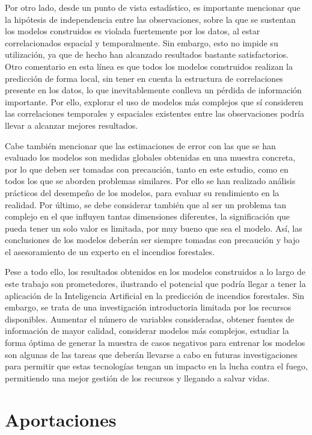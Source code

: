 \documentclass[12pt,a4paper,]{book}
\numberwithin{dummy}{section}
\theoremstyle{ocrenumbox}
\theoremstyle{blacknumex}
\theoremstyle{blacknumbox}
\theoremstyle{ocrenum}
\theoremstyle{ocrenum}
\begin{document}
Por otro lado, desde un punto de vista estadístico, es importante
mencionar que la hipótesis de independencia entre las observaciones,
sobre la que se sustentan los modelos construidos es violada fuertemente
por los datos, al estar correlacionados espacial y temporalmente. Sin
embargo, esto no impide su utilización, ya que de hecho han alcanzado
resultados bastante satisfactorios. Otro comentario en esta línea es que
todos los modelos construidos realizan la predicción de forma local, sin
tener en cuenta la estructura de correlaciones presente en los datos, lo
que inevitablemente conlleva un pérdida de información importante. Por
ello, explorar el uso de modelos más complejos que sí consideren las
correlaciones temporales y espaciales existentes entre las observaciones
podría llevar a alcanzar mejores resultados.

Cabe también mencionar que las estimaciones de error con las que se han
evaluado los modelos son medidas globales obtenidas en una muestra
concreta, por lo que deben ser tomadas con precaución, tanto en este
estudio, como en todos los que se aborden problemas similares. Por ello
se han realizado análisis prácticos del desempeño de los modelos, para
evaluar su rendimiento en la realidad. Por último, se debe considerar
también que al ser un problema tan complejo en el que influyen tantas
dimensiones diferentes, la significación que pueda tener un solo valor
es limitada, por muy bueno que sea el modelo. Así, las conclusiones de
los modelos deberán ser siempre tomadas con precaución y bajo el
asesoramiento de un experto en el incendios forestales.

Pese a todo ello, los resultados obtenidos en los modelos construidos a
lo largo de este trabajo son prometedores, ilustrando el potencial que
podría llegar a tener la aplicación de la Inteligencia Artificial en la
predicción de incendios forestales. Sin embargo, se trata de una
investigación introductoria limitada por los recursos disponibles.
Aumentar el número de variables consideradas, obtener fuentes de
información de mayor calidad, considerar modelos más complejos, estudiar
la forma óptima de generar la muestra de casos negativos para entrenar
los modelos son algunas de las tareas que deberán llevarse a cabo en
futuras investigaciones para permitir que estas tecnologías tengan un
impacto en la lucha contra el fuego, permitiendo una mejor gestión de
los recursos y llegando a salvar vidas.

\hypertarget{aportaciones}{%
\section{Aportaciones}\label{aportaciones}}
\end{document}

